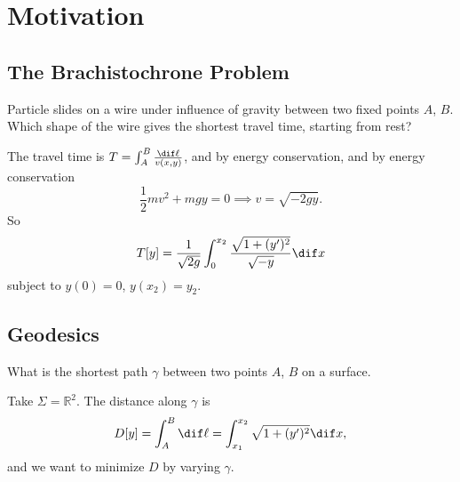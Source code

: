 \section*{Motivation}
\subsection{The Brachistochrone Problem}
\begin{problem}
Particle slides on a wire under influence of gravity between two fixed points \(A\), \(B\). Which shape of the wire gives the shortest travel time, starting from rest?
\end{problem}

The travel time is \(T = \int_{A}^{B} \frac{\dif \ell}{v(x, y)}\), and by energy conservation, and by energy conservation
\[
    \frac{1}{2} mv^2 + mg y = 0 \implies v = \sqrt{-2gy}.
\]
So
\[
    T[y] = \frac{1}{\sqrt{2g}}\int_{0}^{x_2} \frac{\sqrt{1 + (y')^2}}{\sqrt{-y}} \dif x
\]
subject to \(y(0) = 0\), \(y(x_2) = y_2\).
\subsection{Geodesics}
\begin{problem}
    What is the shortest path \(\gamma\) between two points \(A\), \(B\) on a surface.
\end{problem}
Take \(\Sigma = \mathbb{R}^2\). The distance along \(\gamma\) is
\[
    D[y] = \int_{A}^{B}\dif \ell = \int_{x_1}^{x_2} \sqrt{1 + (y')^2} \dif x,
\]
and we want to minimize \(D\) by varying \(\gamma\).